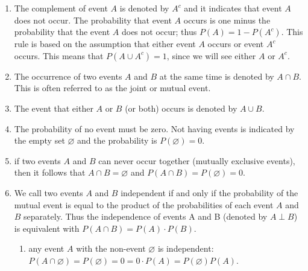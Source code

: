 \begin{enumerate}
    \item The complement of event $A$ is denoted by $A^c$ and it indicates that event $A$ does not occur.
    The probability that event $A$ occurs is one minus the probability that the event $A$ does not occur; thus $P (A) = 1 - P (A^c)$.
    This rule is based on the assumption that either event $A$ occurs or event $A^c$ occurs.
    This means that $P (A \cup A^c) = 1$, since we will see either $A$ or $A^c$.
    \hfill \cite{statistics/book/Statistics-for-Data-Scientists/Maurits-Kaptein}

    \item
    \begin{definition}
        The occurrence of two events $A$ and $B$ at the same time is denoted by $A \cap B$.
        This is often referred to as the joint or mutual event.
        \hfill \cite{statistics/book/Statistics-for-Data-Scientists/Maurits-Kaptein}
    \end{definition}

    \item The event that either $A$ or $B$ (or both) occurs is denoted by $A \cup B$.
    \hfill \cite{statistics/book/Statistics-for-Data-Scientists/Maurits-Kaptein}

    \item The probability of no event must be zero.
    Not having events is indicated by the empty set $\varnothing$ and the probability is $P(\varnothing) = 0$.
    \hfill \cite{statistics/book/Statistics-for-Data-Scientists/Maurits-Kaptein}


    \item
    \begin{definition}[mutually exclusive events ($P (A \cap B) = P (\varnothing) = 0$)]
        if two events $A$ and $B$ can never occur together (mutually exclusive events), then it follows that $A \cap B = \varnothing$ and $P (A \cap B) = P (\varnothing) = 0$.
        \hfill \cite{statistics/book/Statistics-for-Data-Scientists/Maurits-Kaptein}
    \end{definition}

    \item
    \begin{definition}[independent events ($A \perp B$) ($P (A \cap B) = P (A) \cdot P (B)$)]
        We call two events $A$ and $B$ independent if and only if the probability of the mutual event is equal to the product of the probabilities of each event $A$ and $B$ separately.
        Thus the independence of events A and B (denoted by $A \perp B$) is equivalent with $P (A \cap B) = P (A) \cdot P (B)$.
        \hfill \cite{statistics/book/Statistics-for-Data-Scientists/Maurits-Kaptein}
    \end{definition}
    \begin{enumerate}
        \item any event $A$ with the non-event $\varnothing$ is independent: $P(A \cap \varnothing) = P(\varnothing) = 0 = 0 \cdot P(A) = P(\varnothing) P(A)$.
        \hfill \cite{statistics/book/Statistics-for-Data-Scientists/Maurits-Kaptein}


\end{enumerate}
\end{enumerate}
